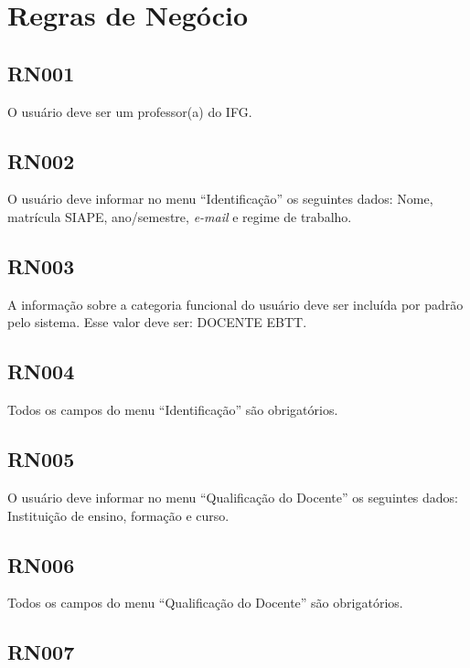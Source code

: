 \newpage
\section{Regras de Negócio}\label{RegrasDeNegocio}

\subsection{RN001}\label{rn001}

O usuário deve ser um professor(a) do IFG.

\subsection{RN002}\label{rn002}

O usuário deve informar no menu ``Identificação'' os seguintes dados: Nome, matrícula SIAPE, ano/semestre, \textit{e-mail} e regime de trabalho.

\subsection{RN003}\label{rn003}

A informação sobre a categoria funcional do usuário deve ser incluída por padrão pelo sistema. Esse valor deve ser: DOCENTE EBTT.

\subsection{RN004}\label{rn004}

Todos os campos do menu ``Identificação'' são obrigatórios. 

\subsection{RN005}\label{rn005}

O usuário deve informar no menu ``Qualificação do Docente'' os seguintes dados: Instituição de ensino, formação e curso.

\subsection{RN006}\label{rn006}

Todos os campos do menu ``Qualificação do Docente'' são obrigatórios. 

\subsection{RN007}\label{rn007}

